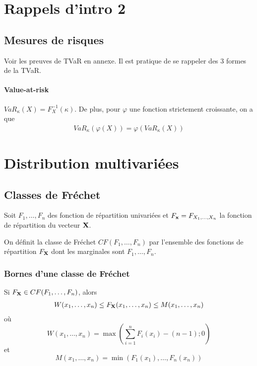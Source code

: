 \documentclass[10pt, french]{article}
\begin{document}

\begin{multicols*}{2} 

\section{Rappels d'intro 2}
\subsection{Mesures de risques}
Voir les preuves de TVaR en annexe. Il est pratique de se rappeler des 3 formes de la TVaR.

\paragraph{Value-at-risk}
$VaR_{\kappa}(X) = F_{X}^{-1}(\kappa)$. De plus, pour $\varphi$ une fonction strictement croissante, on a que
\begin{align*}
VaR_{\kappa}(\varphi(X)) = \varphi \left ( VaR_{\kappa}(X) \right )
\end{align*}



\section{Distribution multivariées}
\subsection{Classes de Fréchet}
Soit $F_1, \dots, F_n$ des fonction de répartition univariées et $F_{\mathbf{x}} = F_{X_1, \dots, X_n}$ la fonction de répartition du vecteur $\mathbf{X}$.

On définit la classe de Fréchet $CF(F_1, \dots, F_n)$ par l'ensemble des fonctions de répartition $F_{\mathbf{X}}$ dont les marginales sont $F_1, \dots, F_n$.

\subsubsection{Bornes d'une classe de Fréchet}
Si $F_{\mathbf{X}} \in CF(F_1, \dots, F_n)$, alors
\begin{align*}
W(x_1, \dots, x_n) \leq F_{\mathbf{X}}(x_1, \dots, x_n) \leq M(x_1, \dots, x_n)
\end{align*}
où
\begin{equation}
\label{eq:cf-born-inf}
W(x_1, \dots, x_n) = \max \left (\sum_{i=1}^{n} F_i(x_i) - (n-1) ; 0 \right )
\end{equation}
et
\begin{equation}
\label{eq:cf-born-sup}
M(x_1, \dots, x_n)	 = \min \left ( F_1(x_1), \dots, F_n(x_n) \right)
\end{equation}



\end{multicols*}
\end{document}
